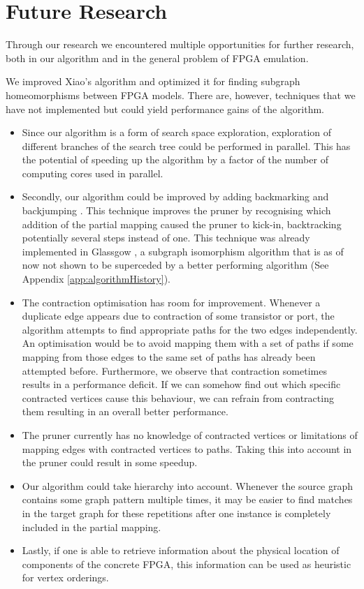 \chapter{Future Research}
Through our research we encountered multiple opportunities for further research, both in our algorithm and in the general problem of FPGA emulation. 

We improved Xiao's algorithm and optimized it for finding subgraph homeomorphisms between FPGA models. There are, however, techniques that we have not implemented but could yield performance gains of the algorithm.
\begin{itemize}
\item Since our algorithm is a form of search space exploration, exploration of different branches of the search tree could be performed in parallel. This has the potential of speeding up the algorithm by a factor of the number of computing cores used in parallel.
\item Secondly, our algorithm could be improved by adding backmarking and backjumping \cite{KONDRAK1997365}. This technique improves the pruner by recognising which addition of the partial mapping caused the pruner to kick-in, backtracking potentially several steps instead of one. This technique was already implemented in Glassgow \cite{McCreesh2015}, a subgraph isomorphism algorithm that is as of now not shown to be superceded by a better performing algorithm (See Appendix \ref{app:algorithmHistory}).
\item The contraction optimisation has room for improvement. Whenever a duplicate edge appears due to contraction of some transistor or port, the algorithm attempts to find appropriate paths for the two edges independently. An optimisation would be to avoid mapping them with a set of paths if some mapping from those edges to the same set of paths has already been attempted before. Furthermore, we observe that contraction sometimes results in a performance deficit. If we can somehow find out which specific contracted vertices cause this behaviour, we can refrain from contracting them resulting in an overall better performance.
\item The pruner currently has no knowledge of contracted vertices or limitations of mapping edges with contracted vertices to paths. Taking this into account in the pruner could result in some speedup.
\item Our algorithm could take hierarchy into account. Whenever the source graph contains some graph pattern multiple times, it may be easier to find matches in the target graph for these repetitions after one instance is completely included in the partial mapping.
\item Lastly, if one is able to retrieve information about the physical location of components of the concrete FPGA, this information can be used as heuristic for vertex orderings.
\end{itemize}

